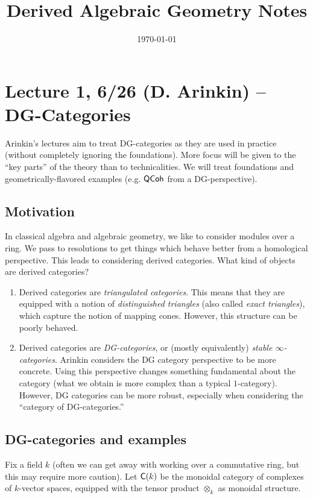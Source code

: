 \documentclass{amsart}
\title{Derived Algebraic Geometry Notes}
\date{\today}
\begin{document}
\maketitle

\section{Lecture 1, 6/26 (D. Arinkin) -- DG-Categories}

Arinkin's lectures aim to treat DG-categories as they are used in practice (without completely ignoring the foundations).
More focus will be given to the ``key parts'' of the theory than to technicalities.
We will treat foundations and geometrically-flavored examples (e.g. $\mathsf{QCoh}$ from a DG-perspective).

\subsection{Motivation}

In classical algebra and algebraic geometry, we like to consider modules over a ring.
We pass to resolutions to get things which behave better from a homological perspective.
This leads to considering derived categories.
What kind of objects are derived categories?

\begin{enumerate}
\item Derived categories are \emph{triangulated categories}.
This means that they are equipped with a notion of \emph{distinguished triangles} (also called \emph{exact triangles}), which capture the notion of mapping cones.
However, this structure can be poorly behaved.
\item Derived categories are \emph{DG-categories}, or (mostly equivalently) \emph{stable $\infty$-categories}.
Arinkin considers the DG category perspective to be more concrete.
Using this perspective changes something fundamental about the category (what we obtain is more complex than a typical $1$-category).
However, DG categories can be more robust, especially when considering the ``category of DG-categories.''
\end{enumerate}

\subsection{DG-categories and examples}

Fix a field $k$ (often we can get away with working over a commutative ring, but this may require more caution).
Let $\mathsf{C}(k)$ be the monoidal category of complexes of $k$-vector spaces, equipped with the tensor product $\otimes_k$ as monoidal structure.
\end{document}
